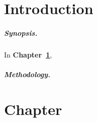 \documentclass[11pt,a4paper,twoside,openany]{report}
\newcommand\declarationpage{}
\newcommand\acknowledgementspage{}
\newcommand\abstractpage{}
\begin{document}
    
    \begin{titlepage}
        
    \end{titlepage}

    \newpage\blankpage








    \tableofcontents

    \chapter*{Introduction}
    \label{chap:introduction}
    
    \lipsum[1-2]

    \paragraph*{Synopsis.} In \textbf{Chapter~\ref{chap:first-chapter}}, \lipsum[3]

    \paragraph*{Methodology.} \lipsum[4]


    \chapter{Chapter}
    \label{chap:first-chapter}
\end{document}
